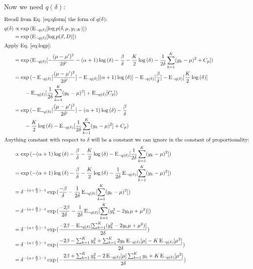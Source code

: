 \documentclass[12pt]{article}
\newcommand{\E}{\operatorname{E}}
\begin{document}
Now we need $q(\delta)$:
\begin{align}
    \intertext{Recall from Eq.~\ref{eq:qform} the form of $q(\delta)$:}
    q(\delta) &\propto \exp{(\E_{\neg q(\delta)}[\log p(\delta, \mu, y_{1:K})])}
    \nonumber \\
    &= \exp{(\E_{\neg q(\delta)}[\log p(\vec{x}, D)])}
    \nonumber \\
    \intertext{Apply Eq.~\ref{eq:logp}:}
    &= \exp{(\E_{\neg q(\delta)}[-\frac{(\mu-\mu')^2}{2\delta'}
    - (\alpha+1)\log{(\delta)} - \frac{\beta}{\delta}
    - \frac{K}{2}\log{(\delta)}
    - \frac{1}{2\delta} \sum_{k=1}^{K} (y_{k} - \mu)^2
    + C_p])}
    \nonumber \\
    &= \exp{}(-\E_{\neg q(\delta)}[\frac{(\mu-\mu')^2}{2\delta'}]
    - \E_{\neg q(\delta)}[(\alpha+1)\log{(\delta)}] - \E_{\neg
    q(\delta)}[\frac{\beta}{\delta}]
    - \E_{\neg q(\delta)}[\frac{K}{2}\log{(\delta)}]
    \nonumber \\
    &\qquad
    - \E_{\neg q(\delta)}[\frac{1}{2\delta} \sum_{k=1}^{K} (y_{k} - \mu)^2]
    + \E_{\neg q(\delta)}[C_p])
    \nonumber \\
    &= \exp{}(-\E_{\neg q(\delta)}[\frac{(\mu-\mu')^2}{2\delta'}]
    - (\alpha+1)\log{(\delta)} - \frac{\beta}{\delta}
    \nonumber \\
    &\qquad
    - \frac{K}{2}\log{(\delta)}
    - \E_{\neg q(\delta)}[\frac{1}{2\delta} \sum_{k=1}^{K} (y_{k} - \mu)^2]
    + C_p)
    \nonumber \\
    \intertext{Anything constant with respect to $\delta$ will be a constant we can
    ignore in the constant of proportionality:}
    &\propto \exp{(
    - (\alpha+1)\log{(\delta)} - \frac{\beta}{\delta}
    - \frac{K}{2}\log{(\delta)}
    - \E_{\neg q(\delta)}[\frac{1}{2\delta} \sum_{k=1}^{K} (y_{k} - \mu)^2
    ])}
    \nonumber \\
    &= \exp{(
    - (\alpha+1)\log{(\delta)} - \frac{\beta}{\delta}
    - \frac{K}{2}\log{(\delta)}
    - \frac{1}{2\delta} \E_{\neg q(\delta)}[\sum_{k=1}^{K} (y_{k} - \mu)^2
    ])}
    \nonumber \\
    &= \delta^{-(\alpha+\frac{K}{2}) - 1}\exp{(
    \frac{-\beta}{\delta}
    - \frac{1}{2\delta} \E_{\neg q(\delta)}[\sum_{k=1}^{K} (y_{k} - \mu)^2
    ])}
    \nonumber \\
    &= \delta^{-(\alpha+\frac{K}{2}) - 1}\exp{(
    \frac{-2\beta}{2\delta}
    - \frac{1}{2\delta} \E_{\neg q(\delta)}[\sum_{k=1}^{K} (y_{k}^2 -2y_{k}\mu +
    \mu^2)
    ])}
    \nonumber \\
    &= \delta^{-(\alpha+\frac{K}{2}) - 1}\exp{(
    \frac{-2\beta
    - \E_{\neg q(\delta)}[\sum_{k=1}^{K} (y_{k}^2 -2y_{k}\mu +
    \mu^2)]}{2\delta}
    )}
    \nonumber \\
    &= \delta^{-(\alpha+\frac{K}{2}) - 1}\exp{(
    \frac{-2\beta
    - \sum_{k=1}^{K} y_{k}^2 + \sum_{k=1}^{K}2y_{k}
    \E_{\neg q(\delta)}[\mu] - K\E_{\neg q(\delta)}[\mu^2]}{2\delta}
    )}
    \nonumber \\
    &= \delta^{-(\alpha+\frac{K}{2}) - 1}\exp{(
    -\frac{2\beta
    + \sum_{k=1}^{K} y_{k}^2 - 2\E_{\neg q(\delta)}[\mu] \sum_{k=1}^{K}y_{k}
    + K\E_{\neg q(\delta)}[\mu^2]}{2\delta}
    )}
\end{align}
\end{document}
